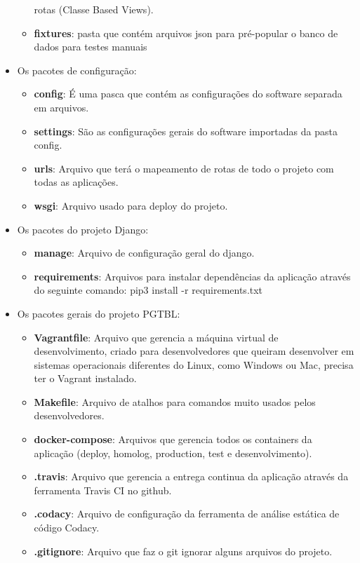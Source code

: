 \begin{itemize}
\begin{itemize}
      rotas (Classe Based Views).
    \item \textbf{fixtures}: pasta que contém arquivos json para pré-popular o banco de dados para testes manuais
  \end{itemize}
  \item Os pacotes de configuração:
  \begin{itemize}
    \item \textbf{config}: É uma pasca que contém as configurações do software separada em arquivos.
    \item \textbf{settings}: São as configurações gerais do software importadas da pasta config.
    \item \textbf{urls}: Arquivo que terá o mapeamento de rotas de todo o projeto com todas as aplicações.
    \item \textbf{wsgi}: Arquivo usado para deploy do projeto.
  \end{itemize}
  \item Os pacotes do projeto Django:
  \begin{itemize}
    \item \textbf{manage}: Arquivo de configuração geral do django.
    \item \textbf{requirements}: Arquivos para instalar dependências da aplicação através do seguinte comando:
      pip3 install -r requirements.txt
  \end{itemize}
  \item Os pacotes gerais do projeto PGTBL:
  \begin{itemize}
    \item \textbf{Vagrantfile}: Arquivo que gerencia a máquina virtual de desenvolvimento, criado para desenvolvedores
      que queiram desenvolver em sistemas operacionais diferentes do Linux, como Windows ou Mac, precisa ter o
      Vagrant instalado.
    \item \textbf{Makefile}: Arquivo de atalhos para comandos muito usados pelos desenvolvedores.
    \item \textbf{docker-compose}: Arquivos que gerencia todos os containers da aplicação
      (deploy, homolog, production, test e desenvolvimento).
    \item \textbf{.travis}: Arquivo que gerencia a entrega continua da aplicação através da ferramenta Travis CI no github.
    \item \textbf{.codacy}: Arquivo de configuração da ferramenta de análise estática de código Codacy.
    \item \textbf{.gitignore}: Arquivo que faz o git ignorar alguns arquivos do projeto.

\end{itemize}
\end{itemize}
